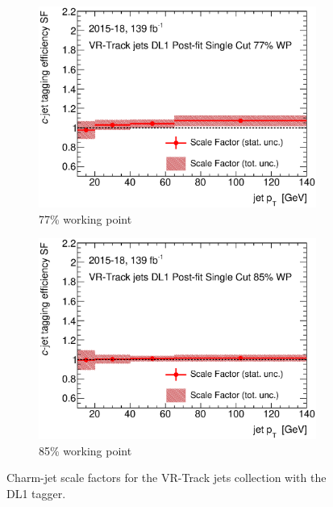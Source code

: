 \documentclass[letterpaper,12pt]{article}
\begin{document}
\begin{figure}[H]
\begin{subfigure}[t]{.35\linewidth}
		\includegraphics[width=1\textwidth]{FTAG_plots/DL1allVRJetsDec/SF77.eps}
		\caption{77\% working point}
		\end{subfigure}
		\begin{subfigure}[t]{.35\linewidth}
		\includegraphics[width=1\textwidth]{FTAG_plots/DL1allVRJetsDec/SF85.eps}
		\caption{85\% working point}
		\end{subfigure}
	\caption{Charm-jet scale factors for the VR-Track jets collection with 
	the DL1 tagger.} \label{fig:Dec_SF_VRJets_DL1}
	\end{figure}
	
\end{document}
